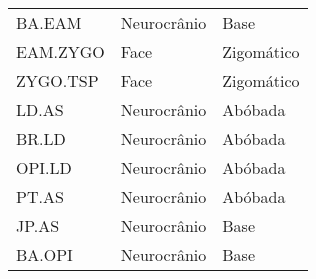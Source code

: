 \begin {table}[hp]
\begin {tabularx} {\textwidth} {X X X}
    BA.EAM & Neurocrânio & Base \\
    EAM.ZYGO & Face & Zigomático \\
    ZYGO.TSP & Face & Zigomático \\
    LD.AS & Neurocrânio & Abóbada \\
    BR.LD & Neurocrânio & Abóbada \\
    OPI.LD & Neurocrânio & Abóbada \\
    PT.AS & Neurocrânio & Abóbada \\
    JP.AS & Neurocrânio & Base \\
    BA.OPI & Neurocrânio & Base \\
  \end {tabularx}
  \hr
\end {table} %